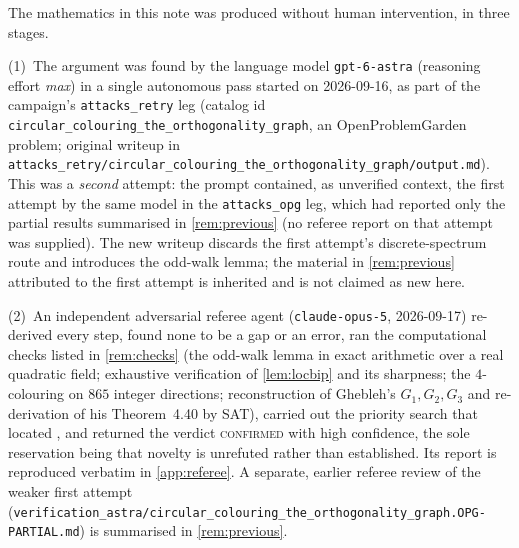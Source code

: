 \documentclass[11pt,a4paper]{article}
\theoremstyle{plain}
\theoremstyle{definition}
\theoremstyle{remark}
\begin{document}
The mathematics in this note was produced without human intervention, in three stages.

(1)~The argument was found by the language model \texttt{gpt-6-astra} (reasoning effort \emph{max}) in a single autonomous pass started on 2026-09-16, as part of the campaign's \texttt{attacks\_retry} leg (catalog id \texttt{circular\_colouring\_the\_orthogonality\_graph}, an OpenProblemGarden problem; original writeup in \texttt{attacks\_retry/circular\_colouring\_the\_orthogonality\_graph/output.md}). This was a \emph{second} attempt: the prompt contained, as unverified context, the first attempt by the same model in the \texttt{attacks\_opg} leg, which had reported only the partial results summarised in \cref{rem:previous} (no referee report on that attempt was supplied). The new writeup discards the first attempt's discrete-spectrum route and introduces the odd-walk lemma; the material in \cref{rem:previous} attributed to the first attempt is inherited and is not claimed as new here.

(2)~An independent adversarial referee agent (\texttt{claude-opus-5}, 2026-09-17) re-derived every step, found none to be a gap or an error, ran the computational checks listed in \cref{rem:checks} (the odd-walk lemma in exact arithmetic over a real quadratic field; exhaustive verification of \cref{lem:locbip} and its sharpness; the $4$-colouring on $865$ integer directions; reconstruction of Ghebleh's $G_1,G_2,G_3$ and re-derivation of his Theorem~4.40 by SAT), carried out the priority search that located \cite{Ghebleh07}, and returned the verdict \textsc{confirmed} with high confidence, the sole reservation being that novelty is unrefuted rather than established. Its report is reproduced verbatim in \cref{app:referee}. A separate, earlier referee review of the weaker first attempt (\texttt{verification\_astra/circular\_colouring\_the\_orthogonality\_graph.OPG-PARTIAL.md}) is summarised in \cref{rem:previous}.
\end{document}
